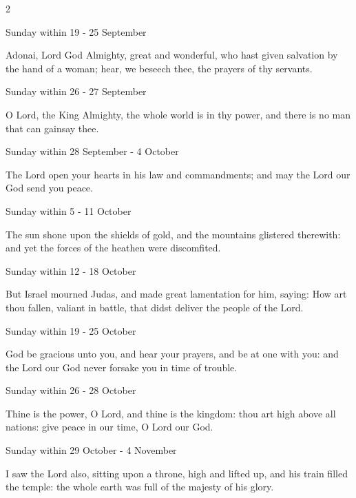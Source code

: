 \begin{multicols}{2}
\begin{inhead}
Sunday within 19 - 25 September
\end{inhead}\par\noindent
Adonai, {\dag} Lord God Almighty, great and wonderful, who hast given salvation by the hand of a woman; hear, we beseech thee, the prayers of thy servants.
\begin{inhead}
Sunday within 26 - 27 September
\end{inhead}\par\noindent
O Lord, {\dag} the King Almighty, the whole world is in thy power, and there is no man that can gainsay thee.
\begin{inhead}
Sunday within 28 September - 4 October
\end{inhead}\par\noindent
The Lord open your hearts {\dag} in his law and commandments; and may the Lord our God send you peace.
\begin{inhead}
Sunday within 5 - 11 October
\end{inhead}\par\noindent
The sun shone {\dag} upon the shields of gold, and the mountains glistered therewith: and yet the forces of the heathen were discomfited.
\begin{inhead}
Sunday within 12 - 18 October
\end{inhead}\par\noindent
But Israel mourned Judas, {\dag} and made great lamentation for him, saying: How art thou fallen, valiant in battle, that didst deliver the people of the Lord.
\begin{inhead}
Sunday within 19 - 25 October
\end{inhead}\par\noindent
God be gracious unto you, {\dag} and hear your prayers, and be at one with you: and the Lord our God never forsake you in time of trouble.
\begin{inhead}
Sunday within 26 - 28 October
\end{inhead}\par\noindent
Thine is the power, O Lord, {\dag} and thine is the kingdom: thou art high above all nations: give peace in our time, O Lord our God.
\begin{inhead}
Sunday within 29 October - 4 November
\end{inhead}\par\noindent
I saw the Lord also, {\dag} sitting upon a throne, high and lifted up, and his train filled the temple: the whole earth was full of the majesty of his glory.


\end{multicols}

